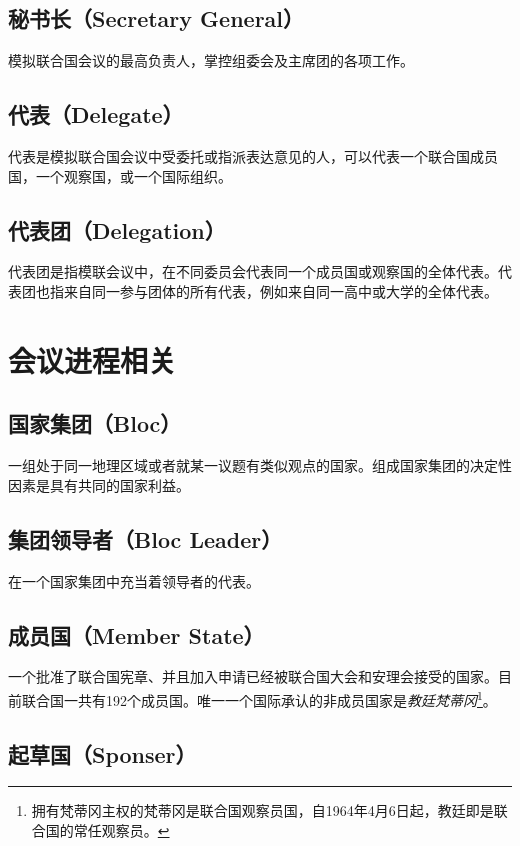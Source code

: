 \documentclass[a4paper,openany]{book}
\begin{document}
\subsection*{秘书长（Secretary General）}

模拟联合国会议的最高负责人，掌控组委会及主席团的各项工作。

\subsection*{代表（Delegate）}

代表是模拟联合国会议中受委托或指派表达意见的人，可以代表一个联合国成员国，一个观察国，或一个国际组织。

\subsection*{代表团（Delegation）}

代表团是指模联会议中，在不同委员会代表同一个成员国或观察国的全体代表。代表团也指来自同一参与团体的所有代表，例如来自同一高中或大学的全体代表。

\section{会议进程相关}

\subsection*{国家集团（Bloc）}

一组处于同一地理区域或者就某一议题有类似观点的国家。组成国家集团的决定性因素是具有共同的国家利益。

\subsection*{集团领导者（Bloc Leader）}

在一个国家集团中充当着领导者的代表。

\subsection*{成员国（Member State）}

一个批准了联合国宪章、并且加入申请已经被联合国大会和安理会接受的国家。目前联合国一共有192个成员国。唯一一个国际承认的非成员国家是\textit{教廷梵蒂冈}\footnote{拥有梵蒂冈主权的梵蒂冈是联合国观察员国，自1964年4月6日起，教廷即是联合国的常任观察员。}。

\subsection*{起草国（Sponser）}
\end{document}

